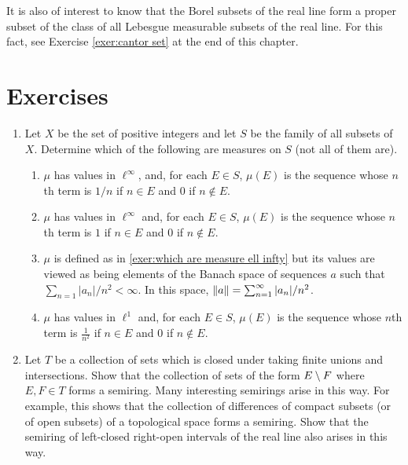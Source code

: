 It is also of interest to know that the Borel subsets of the real line form a proper subset of the class of all Lebesgue measurable subsets of the real line. For this fact, see Exercise \ref{exer:cantor set} at the end of this chapter.

\section{Exercises}

\begin{enumerate}[label=\arabic*),ref=\arabic*]
\item\label{exer:ex of measures}
Let $X$ be the set of positive integers and let $S$ be the family of all subsets of $X$. Determine which of the following are measures on $S$ (not all of them are).
\begin{enumerate}[label=\alph*),ref=\alph*)]
    \item $\mu$ has values in $\ell^\infty$, and, for each $E\in S$, $\mu(E)$ is the sequence whose $n$th term is $1/n$ if $n\in E$ and 0 if $n\notin E$.
    
    \item\label{exer:which are measure ell infty}
    $\mu$ has values in $\ell^\infty$ and, for each $E\in S$, $\mu(E)$ is the sequence whose $n$th term is $1$ if $n\in E$ and $0$ if $n\notin E$.
    
    \item $\mu$ is defined as in \ref{exer:which are measure ell infty} but its values are viewed as being elements of the Banach space of sequences $a$ such that $\sum_{n=1}|a_n|/n^2<\infty$. In this space, $\norm{a}=\sum_{n=1}^\infty|a_n|/n^2$.
    
    \item $\mu$ has values in $\ell^1$ and, for each $E\in S$, $\mu(E)$ is the sequence whose $n$th term is $\frac1{n^2}$ if $n\in E$ and $0$ if $n\notin E$.
\end{enumerate}

\item Let $T$ be a collection of sets which is closed under taking finite unions and intersections. Show that the collection of sets of the form $E\setminus F$ where $E,F\in T$ forms a semiring. Many interesting semirings arise in this way. For example, this shows that the collection of differences of compact subsets (or of open subsets) of a topological space forms a semiring. Show that the semiring of left-closed right-open intervals of the real line also arises in this way.


\end{enumerate}
